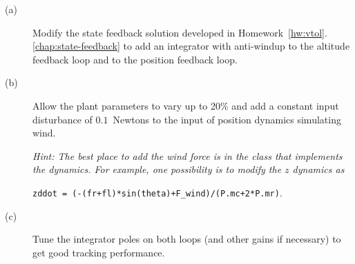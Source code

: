 \begin{description} \item[]
\item[(a)] Modify the state feedback solution developed in Homework~\ref{hw:vtol}.\ref{chap:state-feedback} to add an integrator with anti-windup to the altitude feedback loop and to the position feedback loop.
\item[(b)] Allow the plant parameters to vary up to 20\% and add a constant input disturbance of $0.1$~Newtons to the input of position dynamics simulating wind.  {\it Hint:  The best place to add the wind force is in the class that implements the dynamics.  For example, one possibility is to modify the $z$ dynamics as 

\texttt{zddot = (-(fr+fl)*sin(theta)+F\_wind)/(P.mc+2*P.mr)}.}

\item[(c)] Tune the integrator poles on both loops (and other gains if necessary) to get good tracking performance.  
\end{description}
